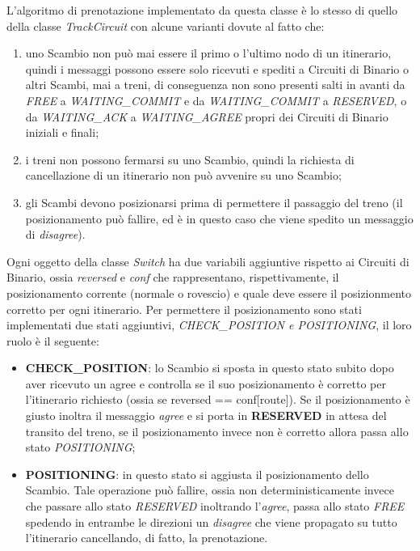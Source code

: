 L’algoritmo di prenotazione implementato da questa classe è lo stesso di quello
della classe \textit{TrackCircuit} con alcune varianti dovute al fatto che:
\begin{enumerate}
  \item uno Scambio non può mai essere il primo o l’ultimo nodo di un itinerario,
quindi i messaggi possono essere solo ricevuti e spediti a Circuiti di Binario o
altri Scambi, mai a treni, di conseguenza non sono presenti salti in avanti da
\textit{FREE} a \textit{WAITING\_COMMIT} e da \textit{WAITING\_COMMIT} a
\textit{RESERVED}, o da \textit{WAITING\_ACK} a \textit{WAITING\_AGREE} propri
dei Circuiti di Binario iniziali e finali;
\item i treni non possono fermarsi su uno Scambio, quindi la richiesta di
 cancellazione di un itinerario non può avvenire su uno Scambio;
\item gli Scambi devono posizionarsi prima di permettere il passaggio del treno
(il posizionamento può fallire, ed è in questo caso che viene spedito un messaggio
di \textit{disagree}). 
\end{enumerate}

Ogni oggetto della classe \textit{Switch} ha due variabili aggiuntive rispetto
ai Circuiti di Binario, ossia \textit{reversed} e \textit{conf} che
rappresentano, rispettivamente, il posizionamento corrente (normale o rovescio)
e quale deve essere il posizionmento corretto per ogni itinerario. Per
permettere il posizionamento sono stati implementati due stati aggiuntivi,
\textit{CHECK\_POSITION e POSITIONING}, il loro ruolo è il seguente:
\begin{itemize}
  \item \textbf{CHECK\_POSITION}: lo Scambio si sposta in questo stato subito
  dopo aver ricevuto un agree e controlla se il suo posizionamento è corretto
  per l’itinerario richiesto (ossia se reversed == conf[route]). Se il
  posizionamento è giusto inoltra il messaggio \textit{agree} e si porta in
  \textbf{RESERVED} in attesa del transito del treno, se il posizionamento
  invece non è corretto allora passa allo stato \textit{POSITIONING};
  \item \textbf{POSITIONING}: in questo stato si aggiusta il posizionamento dello
	Scambio. Tale operazione può fallire, ossia non deterministicamente invece che
	passare allo stato \textit{RESERVED} inoltrando l’\textit{agree}, passa allo
	stato \textit{FREE} spedendo in entrambe le direzioni un \textit{disagree} che
	viene propagato su tutto l’itinerario cancellando, di fatto, la prenotazione.
\end{itemize}

